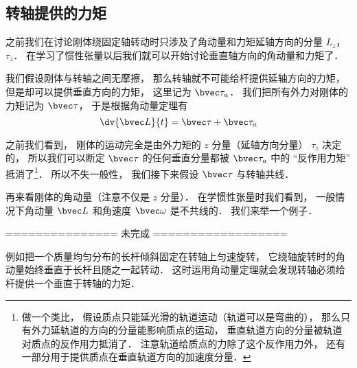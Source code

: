 

\subsection{转轴提供的力矩}
之前我们在讨论刚体绕固定轴转动时只涉及了角动量和力矩延轴方向的分量 $L_z$， $\tau_z$． 在学习了惯性张量以后我们就可以开始讨论垂直轴方向的角动量和力矩了．

我们假设刚体与转轴之间无摩擦， 那么转轴就不可能给杆提供延轴方向的力矩， 但是却可以提供垂直方向的力矩， 这里记为 $\bvec\tau_a$． 我们把所有外力对刚体的力矩记为 $\bvec\tau$， 于是根据角动量定理有
\begin{equation}
\dv{\bvec L}{t} = \bvec\tau + \bvec\tau_a
\end{equation}

之前我们看到， 刚体的运动完全是由外力矩的 $z$ 分量（延轴方向分量） $\tau_z$ 决定的， 所以我们可以断定 $\bvec\tau$ 的任何垂直分量都被 $\bvec\tau_a$ 中的 “反作用力矩” 抵消了\footnote{做一个类比， 假设质点只能延光滑的轨道运动（轨道可以是弯曲的）， 那么只有外力延轨道的方向的分量能影响质点的运动， 垂直轨道方向的分量被轨道对质点的反作用力抵消了． 注意轨道给质点的力除了这个反作用力外， 还有一部分用于提供质点在垂直轨道方向的加速度分量．}． 所以不失一般性， 我们接下来假设 $\bvec\tau$ 与转轴共线．

再来看刚体的角动量（注意不仅是 $z$ 分量）． 在学惯性张量时我们看到， 一般情况下角动量 $\bvec L$ 和角速度 $\bvec \omega$ 是不共线的． 我们来举一个例子．

=============== 未完成 ==================

例如把一个质量均匀分布的长杆倾斜固定在转轴上匀速旋转，%
它绕轴旋转时的角动量始终垂直于长杆且随之一起转动． 这时运用角动量定理就会发现转轴必须给杆提供一个垂直于转轴的力矩．
